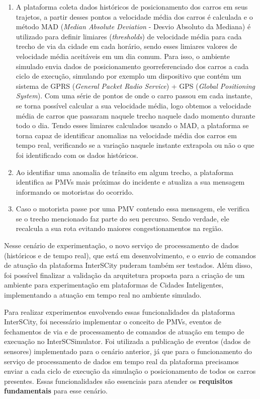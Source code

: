 \begin{enumerate}
    \item A plataforma coleta dados históricos de posicionamento dos carros em seus trajetos, a partir desses pontos a velocidade média dos carros é calculada e o método MAD (\textit{Median Absolute Deviation}
        - Desvio Absoluto da Mediana)\citep{leys_2013} é utilizado para definir limiares (\textit{thresholds}) de velocidade média para cada trecho de via da cidade em cada horário, sendo esses limiares
        valores de velocidade média aceitáveis em um dia comum.
        Para isso, o ambiente simulado envia dados de posicionamento georreferenciado dos carros a cada ciclo de execução, simulando por exemplo um dispositivo que contém um
        sistema de GPRS (\textit{General Packet Radio Service}) + GPS (\textit{Global Positioning System}).
        Com uma série de pontos de onde o carro passou em cada instante, se torna possível calcular a sua velocidade média, logo obtemos a velocidade média de carros
        que passaram naquele trecho naquele dado momento durante todo o dia.
        Tendo esses limiares calculados usando o MAD, a plataforma se torna capaz de identificar anomalias na velocidade média dos carros em tempo real, verificando se a variação naquele instante
        extrapola ou não o que foi identificado com os dados históricos.

    \item Ao identifiar uma anomalia de trânsito em algum trecho, a plataforma identifica as PMVs mais próximas do incidente e atualiza a sua mensagem informando os motoristas
        do ocorrido.

    \item Caso o motorista passe por uma PMV contendo essa mensagem, ele verifica se o trecho mencionado faz parte do seu percurso. Sendo verdade, ele recalcula a sua
        rota evitando maiores congestionamentos na região.
\end{enumerate}

Nesse cenário de experimentação, o novo serviço de processamento de dados (históricos e de tempo real), que está em desenvolvimento, e o envio de comandos de atuação da plataforma
InterSCity puderam também ser testados.
Além disso, foi possível finalizar a validação da arquitetura proposta para a criação de um ambiente para experimentação em plataformas de Cidades Inteligentes,
implementando a atuação em tempo real no ambiente simulado.

Para realizar experimentos envolvendo essas funcionalidades da plataforma InterSCity, foi necessário implementar o conceito de PMVs, eventos de fechamentos de via e de
processamento de comandos de atuação em tempo de execuação no InterSCSimulator.
Foi utilizada a publicação de eventos (dados de sensores) implementado para o cenário anterior, já que para o funcionamento do serviço de processamento de dados
em tempo real da plataforma precisamos enviar a cada ciclo de execução da simulação o posicionamento de todos os carros presentes.
Essas funcionalidades são essenciais para atender os \textbf{requisitos fundamentais} para esse cenário.

